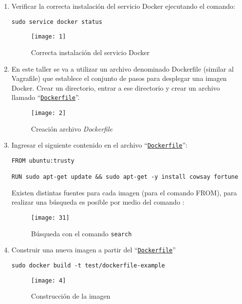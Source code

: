 \documentclass[10pt]{article}   			%
\begin{document}
\begin{enumerate}


\item  Verificar la correcta instalación del servicio Docker ejecutando el comando: \\
\begin{center}
	\texttt{sudo service docker status}
\end{center}
\begin{figure}[ht]
	\centering
	\texttt{[image: 1]}   
	\caption{Correcta instalación del servicio Docker } 
\end{figure}

\item 	En este taller se va a utilizar un archivo denominado Dockerfile (similar al Vagrafile) que establece el conjunto de pasos para desplegar una imagen Docker. Crear un directorio, entrar a ese directorio y crear un archivo llamado “\texttt{\href{https://github.com/wilrilo/talleres/blob/master/file/taller7/files/docker/Dockerfile}{Dockerfile}}”.

\begin{figure}[ht]
	\centering
	\texttt{[image: 2]}   
	\caption{Creación archivo \textit{Dockerfile}} 
\end{figure}


\item Ingresar el siguiente contenido en el archivo “\texttt{\href{https://github.com/wilrilo/talleres/blob/master/file/taller7/files/docker/Dockerfile}{Dockerfile}}”:
\begin{small}
	\begin{lstlisting}[frame=single]	
FROM ubuntu:trusty

RUN sudo apt-get update && sudo apt-get -y install cowsay fortune
	\end{lstlisting}
\end{small}
\newpage
Existen distintas fuentes para cada imagen (para el comando FROM), para realizar una búsqueda es posible por medio del comando :
\begin{figure}[H]
	\centering
	\texttt{[image: 31]}   
	\caption{Búsqueda con el comando \texttt{search} } 
\end{figure}

\item Construir una nueva imagen a partir del “\texttt{\href{https://github.com/wilrilo/talleres/blob/master/file/taller7/files/docker/Dockerfile}{Dockerfile}}”

\begin{center}
	\texttt{sudo docker build -t test/dockerfile-example}
\end{center}
\begin{figure}[ht]
	\centering
	\texttt{[image: 4]}   
	\caption{Construcción de la imagen} 
\end{figure}


\end{enumerate}
\end{document}
